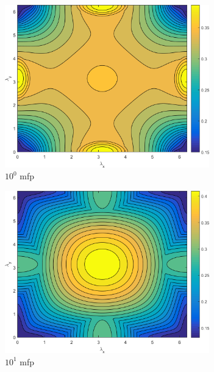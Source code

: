 \begin{figure}
	{
	\begin{subfigure}[b]{0.485\textwidth}
		\centering
		\includegraphics[width=0.975\textwidth]{figures/appendices/SI_M4S_UPWLD1_LS16_x=1_dydx=1_contour.png}
		\caption{$10^{0}$ mfp}
	\end{subfigure}
	\hfill
	\begin{subfigure}[b]{0.485\textwidth}
		\centering
		\includegraphics[width=0.975\textwidth]{figures/appendices/SI_M4S_UPWLD1_LS16_x=10_dydx=1_contour.png}
		\caption{$10^{1}$ mfp}
	\end{subfigure}
	}
	\vspace{0.5cm}
	{
	\begin{subfigure}[b]{0.485\textwidth}

\end{subfigure}}
\end{figure}
